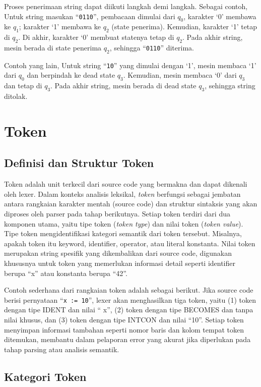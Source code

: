 Proses penerimaan string dapat diikuti langkah demi langkah. Sebagai contoh, Untuk string masukan ``\texttt{0110}'', pembacaan dimulai dari $q_0$, karakter `0' membawa ke $q_1$; karakter `1' membawa ke $q_2$ (state penerima). Kemudian, karakter `1' tetap di $q_2$. Di akhir, karakter `0' membuat statenya tetap di $q_2$. Pada akhir string, mesin berada di state penerima $q_2$, sehingga ``\texttt{0110}'' diterima.

Contoh yang lain, Untuk string ``\texttt{10}'' yang dimulai dengan `1', mesin membaca `1' dari $q_0$ dan berpindah ke dead state $q_3$. Kemudian, mesin membaca `0' dari $q_3$ dan tetap di $q_3$. Pada akhir string, mesin berada di dead state $q_3$, sehingga string ditolak.
\section{Token}

\subsection{Definisi dan Struktur Token}

Token adalah unit terkecil dari source code yang bermakna dan dapat dikenali oleh lexer. Dalam konteks analisis leksikal, \textit{token} berfungsi sebagai jembatan antara rangkaian karakter mentah (source code) dan struktur sintaksis yang akan diproses oleh parser pada tahap berikutnya. Setiap token terdiri dari dua komponen utama, yaitu tipe token (\textit{token type}) dan nilai token (\textit{token value}). Tipe token mengidentifikasi kategori semantik dari token tersebut. Misalnya, apakah token itu keyword, identifier, operator, atau literal konstanta. Nilai token merupakan string spesifik yang dikembalikan dari source code, digunakan khususnya untuk token yang memerlukan informasi detail seperti identifier berupa ``x'' atau konstanta berupa ``42''.

Contoh sederhana dari rangkaian token adalah sebagai berikut. Jika source code berisi pernyataan ``\texttt{x := 10}'', lexer akan menghasilkan tiga token, yaitu (1) token dengan tipe IDENT dan nilai `` x'', (2) token dengan tipe BECOMES dan tanpa nilai khusus, dan (3) token dengan tipe INTCON dan nilai ``10''. Setiap token menyimpan informasi tambahan seperti nomor baris dan kolom tempat token ditemukan, membantu dalam pelaporan error yang akurat jika diperlukan pada tahap parsing atau analisis semantik.

\subsection{Kategori Token}


